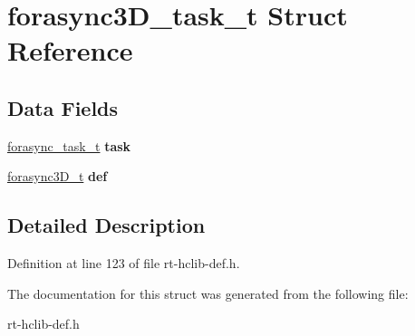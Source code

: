 \hypertarget{structforasync3D__task__t}{\section{forasync3\-D\-\_\-task\-\_\-t Struct Reference}
\label{structforasync3D__task__t}
}
\subsection*{Data Fields}
\begin{DoxyCompactItemize}
\item 
\hypertarget{structforasync3D__task__t_a48e94271c47c8506fb88e55df4ceee17}{\hyperlink{structforasync__task__t}{forasync\-\_\-task\-\_\-t} {\bfseries task}}\label{structforasync3D__task__t_a48e94271c47c8506fb88e55df4ceee17}

\item 
\hypertarget{structforasync3D__task__t_aff6ce4e590b047465ca3bd55238b9adf}{\hyperlink{structforasync3D__t}{forasync3\-D\-\_\-t} {\bfseries def}}\label{structforasync3D__task__t_aff6ce4e590b047465ca3bd55238b9adf}

\end{DoxyCompactItemize}


\subsection{Detailed Description}


Definition at line 123 of file rt-\/hclib-\/def.\-h.



The documentation for this struct was generated from the following file\-:\begin{DoxyCompactItemize}
\item 
rt-\/hclib-\/def.\-h\end{DoxyCompactItemize}

